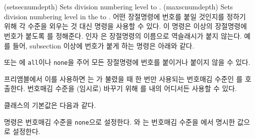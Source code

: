 \begin{syntax}
\cmd{\setsecnumdepth} \\
\cmd{\maxsecnumdepth} \\
\end{syntax}
\glossary(setsecnumdepth)%
  {}%
  {Sets division numbering level to .}
\glossary(maxscnumdepth)%
  {}%
  {Sets division numbering level in the  to .}
어떤 장절명령에 번호를 붙일 것인지를 정하기 위해 각 수준을 외우는 것 대신
\cmd{\setsecnumdepth} 명령을 사용할 수 있다. 이 명령은  이상의
장절명령에 번호가 붙도록 를 정해준다. 인자 은
장절명령의 이름으로 역슬래시가 붙지 않는다. 예를 들어, subsection 이상에 번호가
붙게 하는 명령은 아래와 같다.
\begin{lcode}
\end{lcode}
또는 에 \texttt{all}이나 \texttt{none}을 주어 모든 장절명령에
번호를 붙이거나 붙이지 않을 수 있다.

프리앰블에서 이를 사용하면 \cmd{\setsecnumdepth}는
\cmd{\mainmatter}가 불렸을 때 한 번만 사용되는 번호매김 수준인
\cmd{\maxsecnumdepth}를 호출한다. 번호매김 수준을 (임시로) 바꾸기 위해
\cmd{\setsecnumdepth}를 \cmd{\mainmatter} 내의 어디서든 사용할 수 있다.

클래스의 기본값은 다음과 같다.
\begin{lcode}
\end{lcode}
\cmd{\frontmatter} 명령은 번호매김 수준을 \texttt{none}으로 설정한다.
\cmd{\mainmatter}와 \cmd{\mainmatter*}는 번호매김 수준을 \cmd{\maxsecnumdepth}에서
명시한 값으로 설정한다.

